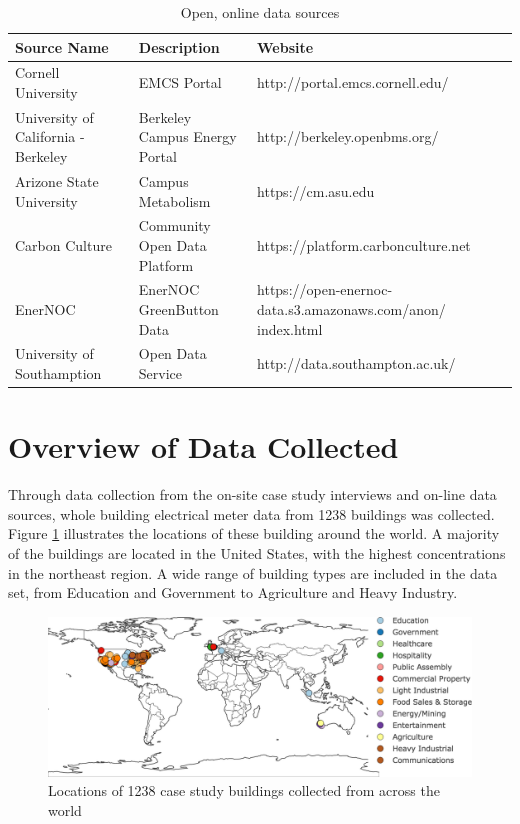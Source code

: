 \begin{table} 
\label{tab:opendata}
    \begin{tabular}{| p{4cm} | p{4cm} | p{6cm} |}
        \hline
        \textbf{Source Name} & \textbf{Description} & \textbf{Website}\\
        \hline
        Cornell University & EMCS Portal & http://portal.emcs.cornell.edu/ \\ 
        \hline
        University of California - Berkeley & Berkeley Campus Energy Portal & http://berkeley.openbms.org/\\ 
        \hline
        Arizone State University & Campus Metabolism & https://cm.asu.edu \\ 
        \hline
        Carbon Culture & Community Open Data Platform & https://platform.carbonculture.net \\ 
        \hline
        EnerNOC & EnerNOC GreenButton Data & https://open-enernoc-data.s3.amazonaws.com/anon/ index.html \\         
        \hline
        University of Southamption & Open Data Service & http://data.southampton.ac.uk/\\         
        \hline
    \end{tabular} 
    \caption{Open, online data sources} 
\end{table}


\section{Overview of Data Collected}
\label{sec:datacollected}

Through data collection from the on-site case study interviews and on-line data sources, whole building electrical meter data from 1238 buildings was collected. Figure \ref{fig:casestudymap} illustrates the locations of these building around the world. A majority of the buildings are located in the United States, with the highest concentrations in the northeast region. A wide range of building types are included in the data set, from Education and Government to Agriculture and Heavy Industry. 


\begin{figure}[ht!]
\begin{center}
\includegraphics[width=0.98\columnwidth]{figures/casestudybuildinglocations/casestudybuildinglocations}
\caption{Locations of 1238 case study buildings collected from across the world
\label{fig:casestudymap}%
}
\end{center}
\end{figure}

